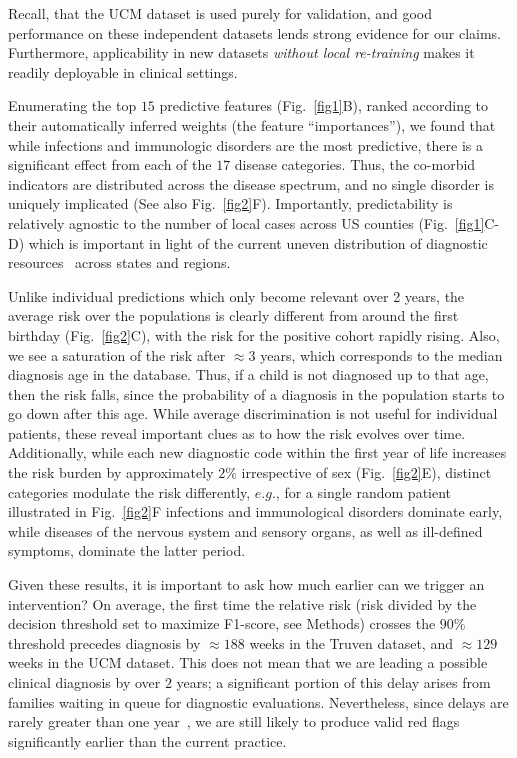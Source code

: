 \documentclass[onecolumn,10pt]{IEEEtran}
\def\treatment{positive\xspace}
\begin{document}
Recall, that the UCM dataset is used purely for validation, and good  performance on these independent datasets lends strong evidence for our claims. Furthermore, applicability in new datasets \textit{without local re-training} makes it readily  deployable in clinical settings.

Enumerating the top $15$ predictive features (Fig.~\ref{fig1}B), ranked  according to their automatically inferred weights  (the feature ``importances''), we found that while infections and immunologic disorders are the most predictive, there is a significant effect from each of  the $17$ disease categories. Thus, the  co-morbid indicators are  distributed across the disease spectrum, and no single  disorder is uniquely implicated (See also Fig.~\ref{fig2}F). Importantly, predictability is relatively agnostic to the number of local cases across US counties (Fig.~\ref{fig1}C-D) which is important in light of the current uneven distribution of  diagnostic resources~\cite{gordon2016whittling,althouse2006pediatric} across states and regions.
 
Unlike individual predictions which only become relevant over 2 years, the average risk over the populations is clearly different  from around the  first birthday (Fig.~\ref{fig2}C), with the risk for the  \treatment cohort rapidly rising. Also, we see a saturation of the risk after $\approx 3$ years, which corresponds to the median diagnosis age in the database. Thus, if a child is not diagnosed up to that age, then the  risk  falls, since the probability of a diagnosis in the population starts to go down after this age. While average discrimination is not useful for individual patients, these reveal important clues as to how the  risk evolves over time. Additionally, while  each  new diagnostic code within the first year of life  increases the risk burden by approximately $2\%$ irrespective of sex (Fig.~\ref{fig2}E), distinct  categories modulate the risk differently, $e.g.$, for a single random patient  illustrated in Fig.~\ref{fig2}F infections and immunological disorders dominate early, while  diseases of the nervous system and sensory organs, as well as ill-defined symptoms,  dominate the latter period.

Given these results, it is important to ask how much earlier can we trigger an intervention? On average,  the first time the relative risk (risk divided by the decision threshold set to maximize F1-score, see Methods) crosses the $90\%$ threshold precedes  diagnosis by  $\approx 188$ weeks in the Truven dataset, and $\approx 129$ weeks in the UCM dataset. This does not mean that we are   leading a possible clinical diagnosis by over $2$ years; a significant portion of this delay arises from families waiting in queue for diagnostic evaluations. Nevertheless, since delays are rarely greater than   one year~\cite{gordon2016whittling},  we are still likely to produce valid red flags significantly earlier than the current practice.
\end{document}
